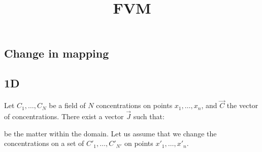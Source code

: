 \documentclass[aps,onecolumn]{revtex4}
\begin{document}
\title{FVM}
\maketitle

\subsection{Change in mapping}


\subsection{1D}

\noindent Let $C_1,\ldots,C_N$ be a field of $N$ concentrations on points $x_1,\ldots,x_n$, and $\vec{C}$ the vector of concentrations.
There exist a vector $\vec{J}$ such that:
 	
be the matter within the domain.
Let us assume that we change the concentrations on a set of $C'_1,\ldots,C'_{N'}$ on points $x'_1,\ldots,x'_n$.
\end{document}
